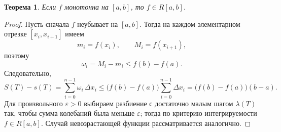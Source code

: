 \documentclass[10pt,a4paper]{article}
\theoremstyle{mystatement}
\newtheorem*{theorem}{Теорема}
\theoremstyle{mydefinition}
\theoremstyle{myremark}
\begin{document}
\begin{theorem}
Если $f$ монотонна на $[a,b]$, то $f\in R[a,b]$.
\end{theorem}

\begin{proof}
Пусть сначала $f$ неубывает на $[a,b]$.
Тогда на каждом элементарном отрезке $[x_i,x_{i+1}]$ имеем
\[
 m_i=f(x_i),\qquad M_i=f(x_{i+1}),
\]
поэтому
\[
\omega_i=M_i-m_i\le f(b)-f(a).
\]
Следовательно,
\[
S(T)-s(T)=\sum_{i=0}^{n-1}\omega_i\,\Delta x_i
\le \bigl(f(b)-f(a)\bigr)\sum_{i=0}^{n-1}\Delta x_i
=\bigl(f(b)-f(a)\bigr)(b-a).
\]
Для произвольного $\varepsilon>0$ выбираем разбиение с достаточно малым шагом $\lambda(T)$ так, чтобы сумма колебаний была меньше $\varepsilon$; тогда по критерию интегрируемости $f\in R[a,b]$.
Случай невозрастающей функции рассматривается аналогично.
\end{proof}
\end{document}
